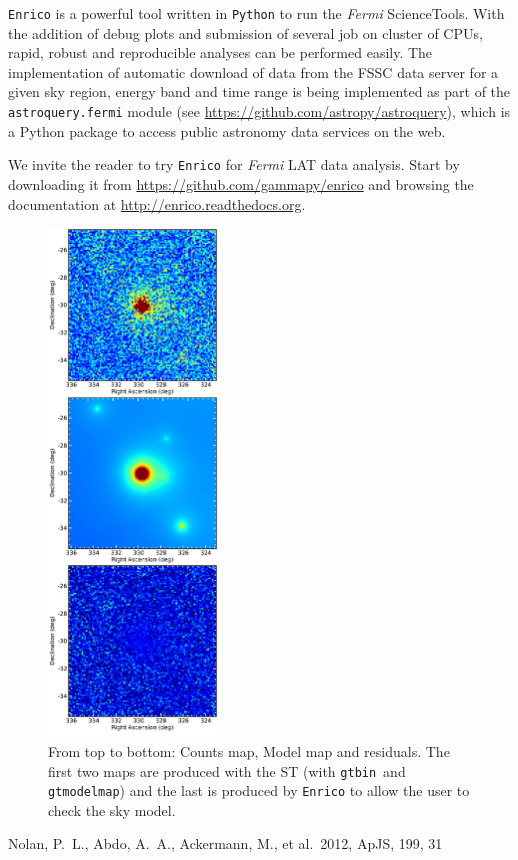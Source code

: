\documentclass[a4paper]{article}
\newcommand{\Fermi}{\textit{Fermi} }
\begin{document}
{\tt Enrico} is a powerful tool written in {\tt Python} to run the \Fermi
ScienceTools. With the addition of debug plots and submission of several job on
cluster of CPUs, rapid, robust and reproducible analyses can be performed
easily. The implementation of automatic download of data from the FSSC data
server for a given sky region, energy band and time range is being implemented
as part of the {\tt astroquery.fermi} module (see
\url{https://github.com/astropy/astroquery}), which is a Python package to
access public astronomy data services on the web.

We invite the reader to try {\tt Enrico} for \Fermi LAT data analysis. Start by
downloading it from \url{https://github.com/gammapy/enrico} and browsing the
documentation at \url{http://enrico.readthedocs.org}.

 \begin{figure}[t]
  \centering
  \includegraphics[width=0.4\textwidth]{icrc2013_89_06}
  \caption{From top to bottom: Counts map, Model map and residuals. The first two maps are produced with the ST (with {\tt gtbin} and {\tt gtmodelmap}) and the last is produced by {\tt Enrico} to allow the user to check the sky model.}
  \label{fig:Map}
 \end{figure}


\begin{thebibliography}{}


 Nolan, P.~L., Abdo, A.~A., Ackermann, M., et al.\ 2012, ApJS, 199, 31 

\end{thebibliography}
\end{document}
